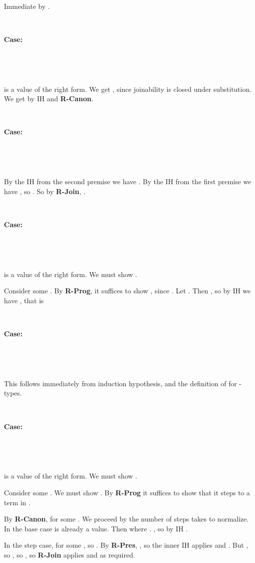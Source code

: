 \documentclass[copyright]{eptcs}
\begin{document}
\ 

\noindent Immediate by .

\ 

\noindent \textbf{Case:}

\



\ 

\noindent  is a value of the right form. We get , since joinability is closed under substitution.
We get  by IH and \textbf{R-Canon}.

\ 

\noindent \textbf{Case:}

\



\ 

\noindent By the IH from the second premise we have .  By the IH from the first
premise we have , so .  So by \textbf{R-Join}, .

\ 

\noindent \textbf{Case:}

\



\ 

\noindent  is a value of the right form. We must show
.


Consider some . By \textbf{R-Prog}, it
suffices to show , since .  Let . Then
, so by IH we have , that is 

\ 

\noindent \textbf{Case:}

\



\ 

\noindent This follows immediately from induction hypothesis, and the
definition of  for -types.

\ 

\noindent \textbf{Case:}

\



\ 

\noindent  is a value of the right form.  We must show
.


Consider some . We must show . By \textbf{R-Prog} it suffices to show that it steps to a term in .

By \textbf{R-Canon},  for some . We proceed by the number
of steps  takes to normalize. In the base case  is already a
value. Then  where .
, so by IH . 

In the step case,  for some , so . By \textbf{R-Pres}, , so the inner IH applies and . But , so , so , so \textbf{R-Join} applies and  as required.
\end{document}

